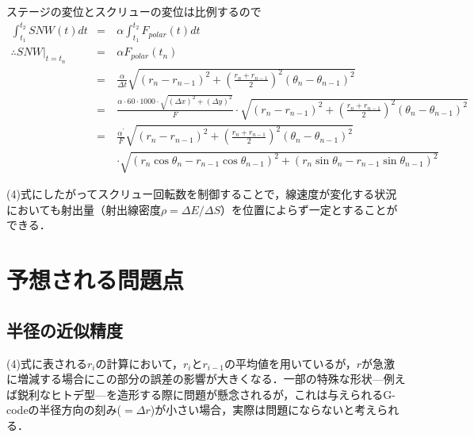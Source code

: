 \documentclass[twocolumn,oneside,a4paper]{article}
\begin{document}
ステージの変位とスクリューの変位は比例するので
\begin{eqnarray}
\int_{t_1}^{t_2} SNW(t)dt &=& \alpha \int_{t_1}^{t_2} F_{polar}(t) dt \nonumber \\
\therefore SNW\big|_{t=t_n} &=& \alpha F_{polar}(t_n)  \nonumber \\
&=& \frac{\alpha}{\Delta t} \sqrt{\left( r_n - r_{n-1} \right)^2 + \left(\frac{r_n+r_{n-1}}{2} \right)^2 \left( \theta_n - \theta_{n-1} \right)^2} \nonumber \\
&=& \frac{\alpha \cdot 60\cdot1000 \cdot \sqrt{(\Delta x)^2+(\Delta y)^2}}{F} \cdot \sqrt{\left( r_n - r_{n-1} \right)^2 + \left(\frac{r_n+r_{n-1}}{2} \right)^2  \left( \theta_n - \theta_{n-1} \right)^2} \nonumber \\
&=& \frac{\alpha^\prime}{F} \sqrt{\left( r_n - r_{n-1} \right)^2 + \left(\frac{r_n+r_{n-1}}{2} \right)^2  \left( \theta_n - \theta_{n-1} \right)^2 }  \nonumber \\
&\quad& \cdot \sqrt{ (r_n \cos\theta_n - r_{n-1} \cos\theta_{n-1})^2+(r_n \sin\theta_n - r_{n-1} \sin\theta_{n-1})^2 }
\end{eqnarray}

(4)式にしたがってスクリュー回転数を制御することで，線速度が変化する状況においても射出量（射出線密度$\rho = \Delta E / \Delta S$）を位置によらず一定とすることができる．

\section{予想される問題点}
\subsection{半径の近似精度} 
(4)式に表される$r_i$の計算において，$r_i$と$r_{i-1}$の平均値を用いているが，$r$が急激に増減する場合にこの部分の誤差の影響が大きくなる．一部の特殊な形状—例えば鋭利なヒトデ型—を造形する際に問題が懸念されるが，これは与えられるG-codeの半径方向の刻み($ = \Delta r$)が小さい場合，実際は問題にならないと考えられる．
\end{document}
